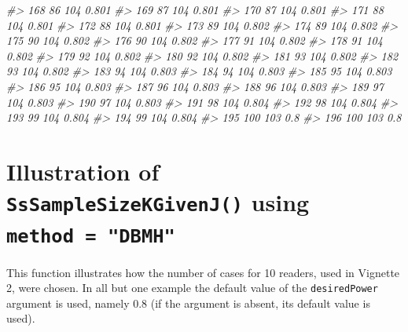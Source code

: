 \documentclass[
]{book}
\newenvironment{Shaded}{\begin{snugshade}}{\end{snugshade}}
\newcommand{\CommentTok}[1]{\textcolor[rgb]{0.56,0.35,0.01}{\textit{#1}}}
\begin{document}
\begin{Shaded}
\begin{Highlighting}[]
\CommentTok{\#\textgreater{} 168         86      104 0.801}
\CommentTok{\#\textgreater{} 169         87      104 0.801}
\CommentTok{\#\textgreater{} 170         87      104 0.801}
\CommentTok{\#\textgreater{} 171         88      104 0.801}
\CommentTok{\#\textgreater{} 172         88      104 0.801}
\CommentTok{\#\textgreater{} 173         89      104 0.802}
\CommentTok{\#\textgreater{} 174         89      104 0.802}
\CommentTok{\#\textgreater{} 175         90      104 0.802}
\CommentTok{\#\textgreater{} 176         90      104 0.802}
\CommentTok{\#\textgreater{} 177         91      104 0.802}
\CommentTok{\#\textgreater{} 178         91      104 0.802}
\CommentTok{\#\textgreater{} 179         92      104 0.802}
\CommentTok{\#\textgreater{} 180         92      104 0.802}
\CommentTok{\#\textgreater{} 181         93      104 0.802}
\CommentTok{\#\textgreater{} 182         93      104 0.802}
\CommentTok{\#\textgreater{} 183         94      104 0.803}
\CommentTok{\#\textgreater{} 184         94      104 0.803}
\CommentTok{\#\textgreater{} 185         95      104 0.803}
\CommentTok{\#\textgreater{} 186         95      104 0.803}
\CommentTok{\#\textgreater{} 187         96      104 0.803}
\CommentTok{\#\textgreater{} 188         96      104 0.803}
\CommentTok{\#\textgreater{} 189         97      104 0.803}
\CommentTok{\#\textgreater{} 190         97      104 0.803}
\CommentTok{\#\textgreater{} 191         98      104 0.804}
\CommentTok{\#\textgreater{} 192         98      104 0.804}
\CommentTok{\#\textgreater{} 193         99      104 0.804}
\CommentTok{\#\textgreater{} 194         99      104 0.804}
\CommentTok{\#\textgreater{} 195        100      103   0.8}
\CommentTok{\#\textgreater{} 196        100      103   0.8}
\end{Highlighting}
\end{Shaded}

\hypertarget{illustration-of-sssamplesizekgivenj-using-method-dbmh}{%
\section{\texorpdfstring{Illustration of \texttt{SsSampleSizeKGivenJ()} using \texttt{method\ =\ "DBMH"}}{Illustration of SsSampleSizeKGivenJ() using method = "DBMH"}}\label{illustration-of-sssamplesizekgivenj-using-method-dbmh}}

This function illustrates how the number of cases for 10 readers, used in Vignette 2, were chosen. In all but one example the default value of the \texttt{desiredPower} argument is used, namely 0.8 (if the argument is absent, its default value is used).
\end{document}
